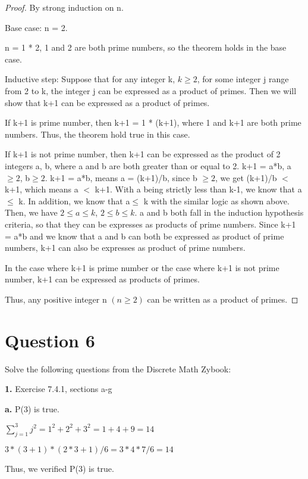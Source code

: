 \documentclass[11pt]{article}
\begin{document}
	\begin{proof}
	By strong induction on n.
	
	Base case: n = 2.
	
	n = 1 * 2, 1 and 2 are both prime numbers, so the theorem holds in the base case.
	
	Inductive step: Suppose that for any integer k, $k\geq 2$, for some integer j range from 2 to k, the integer j can be expressed as a product of primes. Then we will show that k+1 can be expressed as a product of primes. 
	
	If k+1 is prime number, then k+1 = 1 * (k+1), where 1 and k+1 are both prime numbers. Thus, the theorem hold true in this case.
	
	If k+1 is not prime number, then k+1 can be expressed as the product of 2 integers a, b, where a and b are both greater than or equal to 2. k+1 = a*b, a$\geq 2$, b$\geq 2$. k+1 = a*b, means a = (k+1)/b, since b $\geq 2$, we get (k+1)/b $<$ k+1, which means a $<$ k+1. With a being strictly less than k-1, we know that a$\leq$ k. In addition, we know that a$\leq$ k with the similar logic as shown above. Then, we have $2\leq a\leq k$, $2\leq b\leq k$. a and b both fall in the induction hypothesis criteria, so that they can be expresses as products of prime numbers. Since k+1 = a*b and we know that a and b can both be expressed as product of prime numbers, k+1 can also be expresses as product of prime numbers. 
	
	In the case where k+1 is prime number or the case where k+1 is not prime number, k+1 can be expressed as products of primes. 
	
	Thus, any positive integer n $(n\geq 2)$ can be written as a product of primes.
	
	\end{proof}
	
	\newpage
	\section*{Question 6}
	
	Solve the following questions from the Discrete Math Zybook:
	
	\textbf{1. }Exercise 7.4.1, sections a-g
	
	\textbf{a.}
	P(3) is true.
	
	$\sum_{j=1}^{3} j^2=1^2+2^2+3^2=1+4+9=14$
	
	$3*(3+1)*(2*3+1)/6=3*4*7/6=14$
	
	Thus, we verified P(3) is true.
	
\end{document}
